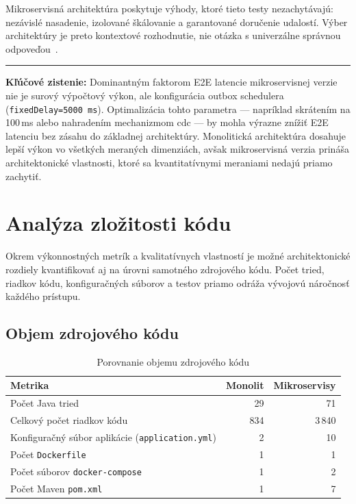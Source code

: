 Mikroservisná architektúra poskytuje výhody, ktoré tieto testy nezachytávajú: nezávislé nasadenie, izolované škálovanie a garantované doručenie udalostí. Výber architektúry je preto kontextové rozhodnutie, nie otázka s univerzálne správnou odpoveďou~\cite{Blinowski2022,Jaros2025}.

\bigskip
\noindent\rule{\linewidth}{0.6pt}

\noindent\textbf{Kľúčové zistenie:} Dominantným faktorom E2E latencie mikroservisnej verzie nie je surový výpočtový výkon, ale konfigurácia outbox schedulera \\ (\texttt{fixedDelay=5000\,ms}). Optimalizácia tohto parametra — napríklad skrátením na 100\,ms alebo nahradením mechanizmom \gls{cdc} — by mohla výrazne znížiť E2E latenciu bez zásahu do základnej architektúry. Monolitická architektúra dosahuje lepší výkon vo všetkých meraných dimenziách, avšak mikroservisná verzia prináša architektonické vlastnosti, ktoré sa kvantitatívnymi meraniami nedajú priamo zachytiť.

\section{Analýza zložitosti kódu}

Okrem výkonnostných metrík a kvalitatívnych vlastností je možné architektonické rozdiely kvantifikovať aj na úrovni samotného zdrojového kódu. Počet tried, riadkov kódu, konfiguračných súborov a testov priamo odráža vývojovú náročnosť každého prístupu.

\subsection*{Objem zdrojového kódu}

\begin{table}[H]
\centering
\begin{tabular}{|p{}|r|r|}
\hline
\textbf{Metrika} & \textbf{Monolit} & \textbf{Mikroservisy} \\ \hline
Počet Java tried                                  & 29 & 71     \\ \hline
Celkový počet riadkov kódu                        & 834 & 3\,840 \\ \hline
Konfiguračný súbor aplikácie (\texttt{application.yml}) & 2 & 10 \\ \hline
Počet \texttt{Dockerfile}                         & 1  & 1      \\ \hline
Počet súborov \texttt{docker-compose}             & 1  & 2      \\ \hline
Počet Maven \texttt{pom.xml}                      & 1  & 7      \\ \hline
\end{tabular}
\caption{Porovnanie objemu zdrojového kódu}
\label{tab:code-complexity}
\end{table}

